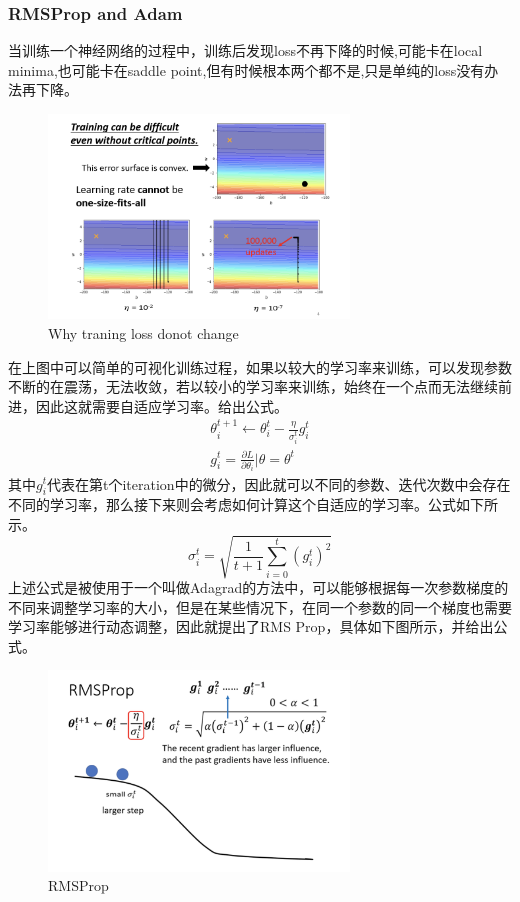 \documentclass{article}
\begin{document}
\subsubsection{RMSProp and Adam}
\indent 当训练一个神经网络的过程中，训练后发现loss不再下降的时候,可能卡在local minima,也可能卡在saddle point,但有时候根本两个都不是,只是单纯的loss没有办法再下降。\par
\begin{figure}[H]
    \centering
    \includegraphics[width=8cm]{picture/TrainingDifficult.png}
    \caption{Why traning loss donot change}
    \label{fig:galxy}
\end{figure}
\indent 在上图中可以简单的可视化训练过程，如果以较大的学习率来训练，可以发现参数不断的在震荡，无法收敛，若以较小的学习率来训练，始终在一个点而无法继续前进，因此这就需要自适应学习率。给出公式。
\begin{equation}
    \begin{split}
     \theta^{t+1}_i \xleftarrow{}\theta^{t}_i - \frac{\eta}{\sigma^{t}_i} g^{t}_i\\
     g^{t}_i = \frac{\partial L}{\partial \theta_{i}} \vert \theta = \theta^{t}
    \end{split}
\end{equation}
\indent 其中\( g^{t}_i\)代表在第t个iteration中的微分，因此就可以不同的参数、迭代次数中会存在不同的学习率，那么接下来则会考虑如何计算这个自适应的学习率。公式如下所示。
\begin{equation}
    \sigma^{t}_{i} = \sqrt{\frac{1}{t+1} \sum^{t}_{i=0} (g^{t}_{i})^{2}}
\end{equation}
\indent 上述公式是被使用于一个叫做Adagrad的方法中，可以能够根据每一次参数梯度的不同来调整学习率的大小，但是在某些情况下，在同一个参数的同一个梯度也需要学习率能够进行动态调整，因此就提出了RMS Prop，具体如下图所示，并给出公式。
\begin{figure}[H]
    \centering
    \includegraphics[width=8cm]{picture/RmsProp.png}
    \caption{RMSProp}
    \label{fig:galxy}
\end{figure}
\end{document}
